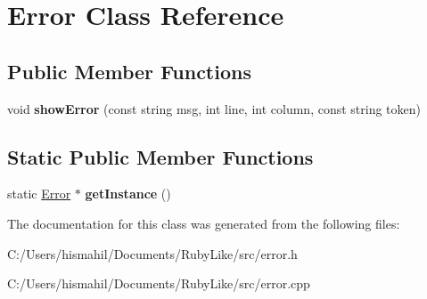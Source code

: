 \hypertarget{class_error}{\section{Error Class Reference}
\label{class_error}
}
\subsection*{Public Member Functions}
\begin{DoxyCompactItemize}
\item 
\hypertarget{class_error_ac4ce8825ddaf31c13d3f055b643fb114}{void {\bfseries show\-Error} (const string msg, int line, int column, const string token)}\label{class_error_ac4ce8825ddaf31c13d3f055b643fb114}

\end{DoxyCompactItemize}
\subsection*{Static Public Member Functions}
\begin{DoxyCompactItemize}
\item 
\hypertarget{class_error_aace9016907bb5372c3f1309db5143c9c}{static \hyperlink{class_error}{Error} $\ast$ {\bfseries get\-Instance} ()}\label{class_error_aace9016907bb5372c3f1309db5143c9c}

\end{DoxyCompactItemize}


The documentation for this class was generated from the following files\-:\begin{DoxyCompactItemize}
\item 
C\-:/\-Users/hismahil/\-Documents/\-Ruby\-Like/src/error.\-h\item 
C\-:/\-Users/hismahil/\-Documents/\-Ruby\-Like/src/error.\-cpp\end{DoxyCompactItemize}

